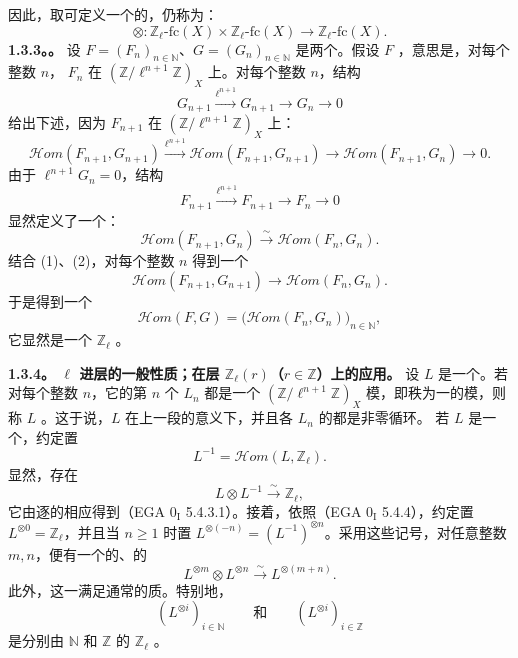 因此，取可定义一个的，仍称为：
\[
\otimes:\mathbb Z_\ell\text{-}\mathrm{fc}(X)\times\mathbb Z_\ell\text{-}\mathrm{fc}(X)
\longrightarrow\mathbb Z_\ell\text{-}\mathrm{fc}(X).
\]
\textbf{1.3.3。。}
设 $F=(F_n)_{n\in\mathbb N}$、$G=(G_n)_{n\in\mathbb N}$ 是两个。假设 $F$ ，意思是，对每个整数 $n$， $F_n$ 在 $(\mathbb Z/\ell^{n+1}\mathbb Z)_X$ 上。对每个整数 $n$，结构
\[
G_{n+1}\xrightarrow{\ell^{n+1}}G_{n+1}\longrightarrow G_n\longrightarrow0
\]
给出下述，因为 $F_{n+1}$ 在 $(\mathbb Z/\ell^{n+1}\mathbb Z)_X$ 上：
\[
\mathcal{H}om(F_{n+1},G_{n+1})\xrightarrow{\ell^{n+1}}
\mathcal{H}om(F_{n+1},G_{n+1})\longrightarrow
\mathcal{H}om(F_{n+1},G_n)\longrightarrow0.\tag{1}
\]
由于 $\ell^{n+1}G_n=0$，结构
\[
F_{n+1}\xrightarrow{\ell^{n+1}}F_{n+1}\longrightarrow F_n\longrightarrow0
\]
显然定义了一个：
\[
\mathcal{H}om(F_{n+1},G_n)\xrightarrow{\sim}\mathcal{H}om(F_n,G_n).\tag{2}
\]
结合 (1)、(2)，对每个整数 $n$ 得到一个
\[
\mathcal{H}om(F_{n+1},G_{n+1})\longrightarrow\mathcal{H}om(F_n,G_n).
\]
于是得到一个
\[
\mathcal{H}om(F,G)=\bigl(\mathcal{H}om(F_n,G_n)\bigr)_{n\in\mathbb N},
\]
它显然是一个 $\mathbb Z_\ell$ 。

\textbf{1.3.4。 $\ell$ 进层的一般性质；在层 $\mathbb Z_\ell(r)$（$r\in\mathbb Z$）上的应用。}
设 $L$ 是一个。若对每个整数 $n$，它的第 $n$ 个 $L_n$ 都是一个 $(\mathbb Z/\ell^{n+1}\mathbb Z)_X$ 模，即秩为一的模，则称 $L$ 。这于说，$L$ 在上一段的意义下，并且各 $L_n$ 的都是非零循环。
若 $L$ 是一个，约定置
\[
L^{-1}=\mathcal{H}om(L,\mathbb Z_\ell).
\]
显然，存在
\[
L\otimes L^{-1}\xrightarrow{\sim}\mathbb Z_\ell,
\]
它由逐的相应得到（EGA $0_{\mathrm I}$ 5.4.3.1）。接着，依照（EGA $0_{\mathrm I}$ 5.4.4），约定置 $L^{\otimes0}=\mathbb Z_\ell$，并且当 $n\geq1$ 时置 $L^{\otimes(-n)}=(L^{-1})^{\otimes n}$。采用这些记号，对任意整数 $m,n$，便有一个的、的
\[
L^{\otimes m}\otimes L^{\otimes n}\xrightarrow{\sim}L^{\otimes(m+n)}.
\]
此外，这一满足通常的质。特别地，
\[
(L^{\otimes i})_{i\in\mathbb N}\qquad\text{和}\qquad(L^{\otimes i})_{i\in\mathbb Z}
\]
是分别由 $\mathbb N$ 和 $\mathbb Z$ 的 $\mathbb Z_\ell$ 。

